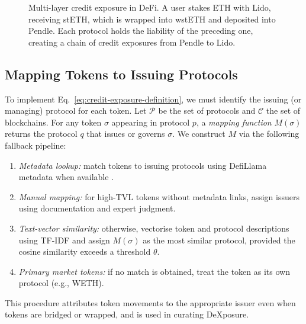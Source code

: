 \begin{figure}[t]
    \caption{Multi-layer credit exposure in DeFi. A user stakes ETH with Lido, receiving stETH, which is wrapped into wstETH and deposited into Pendle. Each protocol holds the liability of the preceding one, creating a chain of credit exposures from Pendle to Lido.}
    \label{fig:exposure_example}
\end{figure}

\subsection{Mapping Tokens to Issuing Protocols}

To implement Eq.~\eqref{eq:credit-exposure-definition}, we must identify the issuing (or managing) protocol for each token. Let $\mathcal{P}$ be the set of protocols and $\mathcal{C}$ the set of blockchains. For any token $\sigma$ appearing in protocol $p$, a \emph{mapping function} $M(\sigma)$ returns the protocol $q$ that issues or governs $\sigma$. We construct $M$ via the following fallback pipeline:
\begin{enumerate}
  \item \emph{Metadata lookup:} match tokens to issuing protocols using DefiLlama metadata when available \cite{DefiLlama2026}.
  \item \emph{Manual mapping:} for high-TVL tokens without metadata links, assign issuers using documentation and expert judgment.
  \item \emph{Text-vector similarity:} otherwise, vectorise token and protocol descriptions using TF-IDF \cite{Qaiser2018} and assign $M(\sigma)$ as the most similar protocol, provided the cosine similarity exceeds a threshold $\theta$.
  \item \emph{Primary market tokens:} if no match is obtained, treat the token as its own protocol (e.g., WETH).
\end{enumerate}
This procedure attributes token movements to the appropriate issuer even when tokens are bridged or wrapped, and is used in curating DeXposure.

